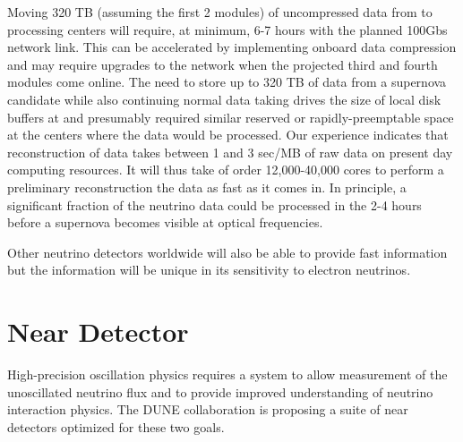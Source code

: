 \documentclass[../main-v1.tex]{subfiles}
\begin{document}



Moving  320 TB (assuming the first 2 modules) of uncompressed data   from  to processing centers will require, at minimum, 6-7 hours with the planned 100Gbs network link.  This can be accelerated by implementing onboard data compression and may require upgrades to the network when the projected third and fourth modules come online.  The need to store up to 320 TB of data from a supernova candidate while also continuing normal data taking drives the size of local disk buffers at  and presumably required similar reserved or rapidly-preemptable space at the centers where the data would be processed. Our  experience indicates that reconstruction of  data takes between 1 and 3 sec/MB of raw data on present day computing resources.  It will thus take of order 12,000-40,000 cores to perform a preliminary reconstruction the data as fast as it comes in. In principle, a significant fraction of the neutrino data could be processed  in the 2-4 hours before a supernova becomes visible at optical frequencies.

Other neutrino detectors worldwide will also be able to provide fast information but the  information will be unique in its sensitivity to electron neutrinos. 







\section{Near Detector }

High-precision oscillation physics requires a  system to allow measurement of the unoscillated neutrino flux and %
to provide improved understanding of neutrino interaction physics. 
The DUNE  collaboration is proposing a suite of near detectors optimized for these two goals. 
 
\end{document}
